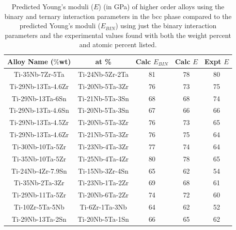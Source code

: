 \newpage
\begin{table}[H]
	\caption{Predicted Young's moduli ($E$) (in GPa) of higher order alloys using the binary and ternary interaction parameters in the bcc phase compared to the predicted Young's moduli ($E_{BIN}$) using just the binary interaction parameters and the experimental values found with both the weight percent and atomic percent listed.}
	\centering
	\begin{tabular}{ c c c c c }
		\hline
		Alloy Name ($\%$wt) & at \% & Calc $E_{BIN}$ & Calc $E$ & Expt $E$\\
		\hline
		Ti-35Nb-7Zr-5Ta \cite{Geetha2009} & Ti-24Nb-5Zr-2Ta & 81 & 78 & 80\\
		Ti-29Nb-13Ta-4.6Zr \cite{Geetha2009}  & Ti-20Nb-5Ta-3Zr & 76 & 73 & 75\\
		Ti-29Nb-13Ta-6Sn \cite{Geetha2009} & Ti-21Nb-5Ta-3Sn & 68 & 68 & 74\\
		Ti-29Nb-13Ta-4.6Sn \cite{Geetha2009} & Ti-20Nb-5Ta-3Sn & 67 & 66 & 66\\
		Ti-29Nb-13Ta-4.5Zr \cite{Geetha2009} & Ti-20Nb-5Ta-3Zr & 76 & 73 & 65\\
		Ti-29Nb-13Ta-4.6Zr \cite{Tane2010a} & Ti-21Nb-5Ta-3Zr & 76 & 75 & 64\\
		Ti-30Nb-10Ta-5Zr \cite{Tane2010a} & Ti-23Nb-4Ta-3Zr & 77 & 74 & 64\\
		Ti-35Nb-10Ta-5Zr \cite{Tane2010a} & Ti-25Nb-4Ta-4Zr & 80 & 78 & 65\\
		Ti-24Nb-4Zr-7.9Sn \cite{Mohammed2014} & Ti-15Nb-3Zr-4Sn & 65 & 62 & 54\\
		Ti-35Nb-2Ta-3Zr \cite{Mohammed2014} & Ti-23Nb-1Ta-2Zr & 69 & 68 & 61\\
		Ti-29Nb-11Ta-5Zr \cite{Mohammed2014} & Ti-20Nb-6Ta-2Zr & 74 & 72 & 60\\
		Ti-10Zr-5Ta-5Nb \cite{Mohammed2014} & Ti-6Zr-1Ta-3Nb & 64 & 62 & 52\\
		Ti-29Nb-13Ta-2Sn \cite{Mohammed2014} & Ti-20Nb-5Ta-1Sn & 66 & 65 & 62\\
		\hline
	\end{tabular}
	\label{Ch6-table:tixydatacomp}
\end{table}
\clearpage

